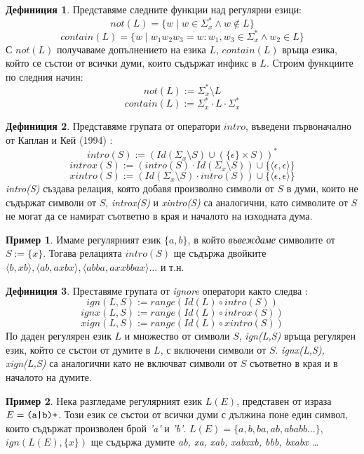 \documentclass[12pt, oneside]{article}
\theoremstyle{definition}
\newtheorem{definition}{Дефиниция}[section]
\newtheorem{example}{Пример}[section]
\begin{document}
\begin{definition}
	Представяме следните функции над регулярни езици:
	\[ not(L) = \{ w \mid w \in \Sigma_x^* \land w \notin L \} \]
	\[ contain(L) = \{ w \mid w_1w_2w_3 = w: w_1, w_3 \in \Sigma_x^* \land w_2 \in L \} \]
	С \( not(L) \) получаваме допълнението на езика \(L\), \( contain(L) \) връща езика, който се състои от всички думи, които съдържат инфикс в \(L\). Строим функциите по следния начин:
	\[ not(L) := \Sigma_x^* \setminus L \]
	\[ contain(L) := \Sigma_x^* \cdot L \cdot \Sigma_x^* \]
\end{definition}

\begin{definition}
	Представяме групата от оператори \(intro\), въведени първоначално от Каплан и Кей (1994) \cite{Kaplan&Kay:94}:
	\[ intro(S) := (Id(\Sigma_x \setminus S) \cup (\{\epsilon\} \times S))^* \]
	\[ introx(S) := (intro(S) \cdot Id(\Sigma_x \setminus S)) \cup \{\langle \epsilon, \epsilon \rangle \} \]
	\[ xintro(S) := (Id(\Sigma_x \setminus S) \cdot intro(S)) \cup \{\langle \epsilon, \epsilon \rangle \} \]
	\emph{intro(S)} създава релация, която добавя произволно символи от \(S\) в думи, които не съдържат символи от \(S\), \emph{introx(S)} и \emph{xintro(S)} са аналогични, като символите от \(S\) не могат да се намират съответно в края и началото на изходната дума.
\end{definition}

\begin{example}
	Имаме регулярният език \( \{a,b\} \), в който \emph{въвеждаме} символите от \(S := \{ x \}\). Тогава релацията \(intro(S)\) ще съдържа двойките \( \langle b, xb \rangle, \langle ab, axbx \rangle, \langle abba, axxbbax \rangle \dots \) и т.н.
\end{example}

\begin{definition}
	Преставяме групата от \emph{ignore} оператори както следва \cite{Kaplan&Kay:94}:
	\[ ign(L,S) := range(Id(L) \circ intro(S)) \]
	\[ ignx(L,S) := range(Id(L) \circ introx(S)) \]
	\[ xign(L,S) := range(Id(L) \circ xintro(S)) \]
	По даден регулярен език \(L\) и множество от символи \(S\), \emph{ign(L,S)} връща регулярен език, който се състои от думите в \(L\), с включени символи от \(S\). \emph{ignx(L,S), xign(L,S)} са аналогични като не включват символи от \(S\) съответно в края и в началото на думите.	
\end{definition}

\begin{example}
	Нека разгледаме регулярният език \(L(E)\), представен от израза \( E = \verb/(a|b)+/ \). Този език се състои от всички думи с дължина поне един символ, които съдържат произволен брой \emph{'a'} и \emph{'b'}. \( L(E) = \{a, b, ba, ab, ababb \dots \} \), \( ign(L(E), \{x\}) \) ще съдържа думите \emph{ab, xa, xab, xabxxb, bbb, bxabx \dots }
\end{example}
\end{document}
